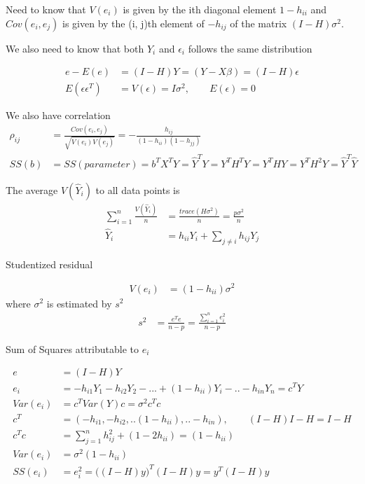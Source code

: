 \documentclass[11pt]{article} %
\begin{document}
Need to know that $V(e_i)$ is given by the ith diagonal element $1 - h_{ii}$  and $Cov(e_i ,e_j )$ is given by the (i, j)th  element of $ -h_{ij}$ of the matrix $(I-H) \sigma^2$.

We also need to know that both $Y_i$ and $\epsilon_i$ follows the same distribution

\begin{align*}
	e - E(e) &= (I-H) Y = (Y- X\beta) = (I-H) \epsilon \\
	E(\epsilon \epsilon^T) &= V(\epsilon) = I\sigma^2 , \qquad E(\epsilon) = 0
\end{align*} 

We also have correlation
\begin{align*}
   \rho_{ij} &= \frac{Cov(e_i, e_j)}{\sqrt{V(e_i)V(e_j)}} = -\frac{h_{ij}}{(1-h_{ii}) (1-h_{jj})} \\
   SS(b) &= SS(parameter) = b^T X^T Y = \hat{Y}^T Y = Y^T H^T Y =  Y^T H Y =  Y^T H^2 Y = \hat{Y}^T \hat{Y}
\end{align*} 

The average $V(\hat{Y}_i)$ to all data points is
\begin{align*}
	\sum_{i=1}^n \frac{V(\hat{Y}_i)}{n} &= \frac{trace(H \sigma^2)}{n} = \frac{p \sigma^2}{n} \\
	\hat{Y}_i &= h_{ii}Y_i + \sum_{j \neq i} h_{ij} Y_j
\end{align*} 

Studentized residual

\begin{align*}
	 V(e_i) & = (1- h_{ii}) \sigma^2 
\end{align*} 
where $\sigma^2$ is estimated by $s^2$
\begin{align*}
 s^2 & = \frac{e^T e}{n-p} = \frac{\sum_{i=1}^n e_i^2}{n-p}
\end{align*} 

Sum of Squares attributable to $e_i$

\begin{align*}
	e & = (I-H)Y\\
	e_i &= -h_{i1} Y_1 - h_{i2} Y_2 - ... + (1- h_{ii}) Y_i -.. -h_{in} Y_n = c^T Y\\
	Var(e_i) &= c^T Var(Y) c = \sigma^2 c^T c \\
	c^T &= ( -h_{i1}, - h_{i2}, ..  (1- h_{ii}), .. -h_{in}), \qquad (I-H) I-H = I-H\\
	c^T c &= \sum_{j=1}^n h_{ij}^2 + (1- 2h_{ii}) = (1-h_{ii})\\
	Var(e_i) &=  \sigma^2 (1-h_{ii}) \\
	SS(e_i) &= {e_i^2} = \Big((I-H)y\Big)^T (I-H)y = y^T (I-H) y
\end{align*} 
\end{document}
